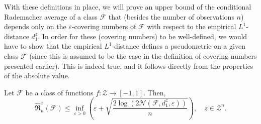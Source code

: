 With these definitions in place, we will prove an upper bound of the conditional Rademacher average of a class $\mathcal{F}$ that (besides the number of observations $n$) depends only on the $\varepsilon$-covering numbers of $\mathcal{F}$ with respect to the empirical $L^1$-distance $d_1^z$. In order for these (covering numbers) to be well-defined, we would have to show that the empirical $L^1$-distance defines a pseudometric on a given class $\mathcal{F}$ (since this is assumed to be the case in the definition of covering numbers presented earlier). This is indeed true, and it follows directly from the properties of the absolute value.

\begin{theorem}
\label{thm: bound on conditional rademacher average}
Let $\mathcal{F}$ be a class of functions $f \colon \mathcal{Z} \to [-1, 1]$. Then,
\[
    \hat{\mathfrak{R}}_n^z(\mathcal{F}) \leq \inf_{\varepsilon > 0} \left( \varepsilon + \sqrt{\frac{2 \log(2 \mathcal{N}(\mathcal{F}, d_1^z, \varepsilon))}{n}} \right), \quad z \in \mathcal{Z}^n.
\]
\end{theorem}

